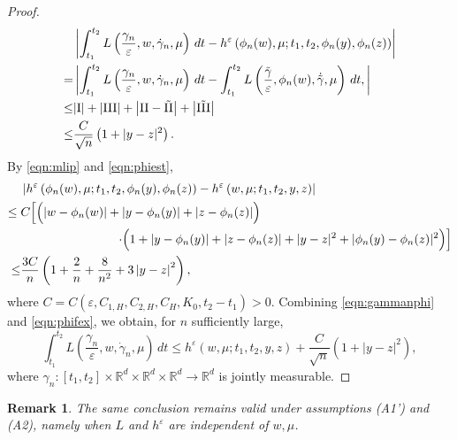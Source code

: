 \documentclass[reqno,11pt]{amsart}
\newtheorem{remark}[theorem]{Remark}
\numberwithin{equation}{section}
\newcommand{\R}{\mathbb{R}} %
\newcommand{\e}{\varepsilon}
\newcommand{\ep}{\varepsilon}
\begin{document}
\begin{proof}
\begin{equation}
\begin{aligned}\label{eqn:gammanphi}
&\left|\int_{t_1}^{t_2}
L \left(\frac{\gamma_n}{\e},w, \dot{\gamma}_n, \mu\right)\,dt- h^\ep\left(\phi_n(w), \mu;t_1, t_2, \phi_n(y), \phi_n(z)\right)\right|\\
=&\left|
\int_{t_1}^{t_2}
L \left(\frac{\gamma_n}{\varepsilon},w,\dot{\gamma}_n, \mu\right)\,dt-
\int_{t_1}^{t_2} L \left(\frac{\tilde{\gamma}}{\varepsilon},\phi_n(w),\dot{\tilde{\gamma}},\mu\right)\,dt,\right|\\
\leq & |\mathrm{I}|+ |\mathrm{III}|+\left|{\rm II}-\tilde{{\rm II}}\right|+\left|\tilde{{\rm III}}\right|\\
\leq & \frac{C}{\sqrt{n}} \left(1+|y-z|^2\right) .
\end{aligned}
\end{equation}
By \eqref{eqn:mlip} and \eqref{eqn:phiest},
\begin{equation}
\begin{aligned}\label{eqn:phifex}
&\left|h^\ep\left(\phi_n(w), \mu;t_1, t_2, \phi_n(y), \phi_n(z)\right)-h^\ep\left(w, \mu;t_1, t_2, y, z\right)\right| \\
\leq\;&
C\Bigl[\Bigl(\left|w-\phi_n(w)\right|+\left| y-\phi_n(y)\right|+\lvert z-\phi_n(z)\rvert \Bigr)\Bigr. \\
& \Bigl. \qquad  \qquad \qquad \qquad \cdot
\Bigl(
1
+\lvert y-\phi_n(y)\rvert
+\lvert z-\phi_n(z)\rvert
+\lvert y-z\rvert^2
+\lvert \phi_n(y)-\phi_n(z)\rvert^2
\Bigr)\Bigr]\\
\leq & \frac{3C}{n}\left(1+\frac{2}{n}+\frac{8}{n^2}+3\left| y-z\right|^2\right),
\end{aligned}
\end{equation}
where $C=C(\ep,C_{1,H}, C_{2, H}, C_H, K_0, t_2-t_1)>0$. Combining \eqref{eqn:gammanphi} and \eqref{eqn:phifex}, we obtain, for $n$ sufficiently large,
\[
\int_{t_1}^{t_2}
L \left(\frac{\gamma_n}{\e},w, \dot{\gamma}_n, \mu\right)\,dt \leq h^\ep\left(w, \mu;t_1, t_2, y, z\right) +   \frac{C}{\sqrt{n}}\left(1+|y-z|^2\right),
\]
where $\gamma_n:[t_1, t_2]\times \R^d \times \R^d\times \R^d\to \R^d$ is jointly measurable.
\end{proof}

\begin{remark}
   The same conclusion remains valid under assumptions (A1') and (A2), namely when $L$ and $h^\e$ are independent of $w, \mu$.
\end{remark}





\end{document}
